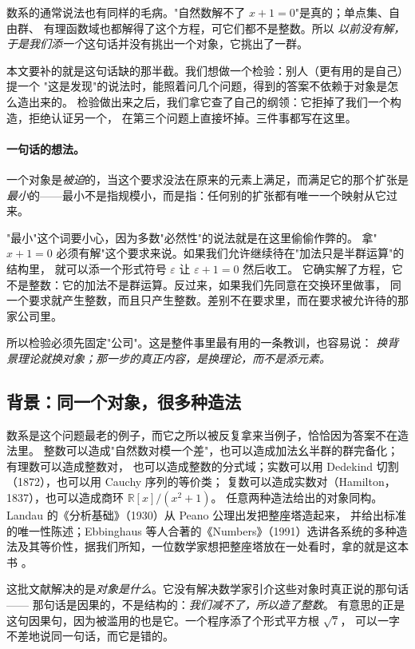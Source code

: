 \documentclass[aps,prd,preprint,superscriptaddress,amsmath,amssymb]{revtex4-2}
\begin{document}
数系的通常说法也有同样的毛病。"自然数解不了 $x+1=0$"是真的；单点集、自由群、
有理函数域也都解得了这个方程，可它们都不是整数。所以
\emph{以前没有解，于是我们添一个}这句话并没有挑出一个对象，它挑出了一群。

本文要补的就是这句话缺的那半截。我们想做一个检验：别人（更有用的是自己）提一个
"这是发现"的说法时，能照着问几个问题，得到的答案不依赖于对象是怎么造出来的。
检验做出来之后，我们拿它查了自己的纲领：它拒掉了我们一个构造，拒绝认证另一个，
在第三个问题上直接坏掉。三件事都写在这里。

\paragraph{一句话的想法。}
一个对象是\emph{被迫}的，当这个要求没法在原来的元素上满足，而满足它的那个扩张是
\emph{最小}的——最小不是指规模小，而是指：任何别的扩张都有唯一一个映射从它过来。

"最小"这个词要小心，因为多数"必然性"的说法就是在这里偷偷作弊的。
拿"$x+1=0$ 必须有解"这个要求来说。如果我们允许继续待在"加法只是半群运算"的结构里，
就可以添一个形式符号 $\varepsilon$ 让 $\varepsilon+1=0$ 然后收工。
它确实解了方程，它不是整数：它的加法不是群运算。反过来，如果我们先同意在交换环里做事，
同一个要求就产生整数，而且只产生整数。差别不在要求里，而在要求被允许待的那家公司里。

所以检验必须先固定"公司"。这是整件事里最有用的一条教训，也容易说：
\emph{换背景理论就换对象；那一步的真正内容，是换理论，而不是添元素。}

\subsection*{背景：同一个对象，很多种造法}

数系是这个问题最老的例子，而它之所以被反复拿来当例子，恰恰因为答案不在造法里。
整数可以造成"自然数对模一个差"，也可以造成加法幺半群的群完备化；有理数可以造成整数对，
也可以造成整数的分式域；实数可以用 Dedekind 切割（1872），也可以用 Cauchy 序列的等价类；
复数可以造成实数对（Hamilton，1837），也可以造成商环 $\mathbb{R}[x]/(x^2+1)$。
任意两种造法给出的对象同构。Landau 的《分析基础》（1930）从 Peano 公理出发把整座塔造起来，
并给出标准的唯一性陈述；Ebbinghaus 等人合著的《Numbers》（1991）选讲各系统的多种造法及其等价性，据我们所知，一位数学家想把整座塔放在一处看时，拿的就是这本书
\cite{landau,dedekind,ebb}。

这批文献解决的是\emph{对象是什么}。它没有解决数学家引介这些对象时真正说的那句话——
那句话是因果的，不是结构的：\emph{我们减不了，所以造了整数}。
有意思的正是这句因果句，因为被滥用的也是它。一个程序添了个形式平方根 $\sqrt 7$，
可以一字不差地说同一句话，而它是错的。
\end{document}
